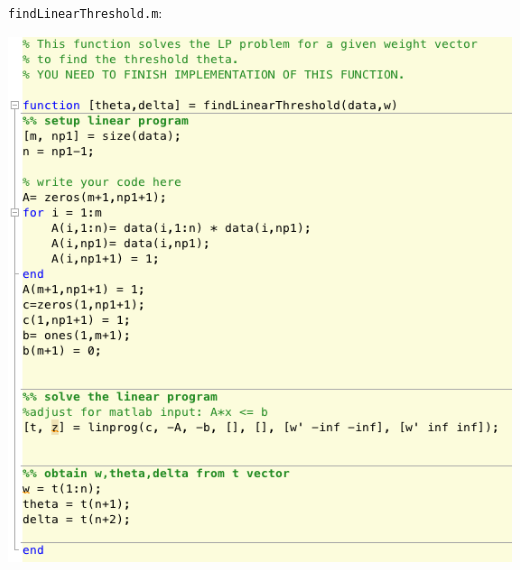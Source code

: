 \begin{enumerate}
\begin{center}
\end{center}
\clearpage
{\tt findLinearThreshold.m}:\\
\begin{center}
	\includegraphics[scale= 0.8]{fig8}
\end{center}

\end{enumerate}

